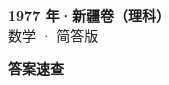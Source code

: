 \documentclass[zihao=-4, a4paper]{ctexart}
\begin{document}
\begin{center}
  {\Large\bfseries 1977 年·新疆卷（理科）}\\[4pt]
  {\large 数学 · 简答版}
\end{center}
\medskip
{}

\clearpage
{}
\begin{center}{\Large\bfseries 答案速查}\end{center}
\medskip

\end{document}
